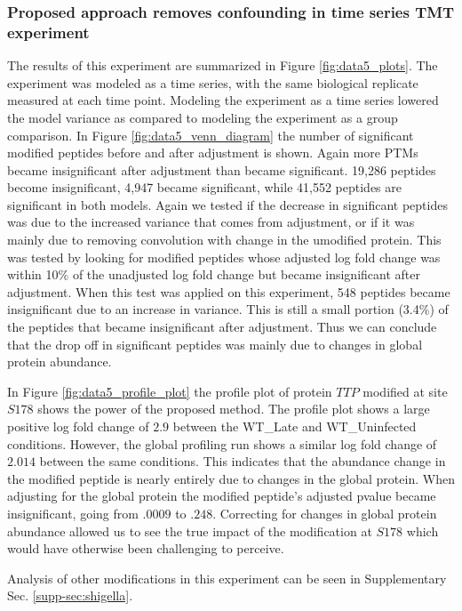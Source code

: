 \documentclass[mcp]{article}
\numberwithin{table}{section}
\begin{document}
\subsubsection*{Proposed approach removes confounding in time series TMT experiment}

The results of this experiment are summarized in Figure \ref{fig:data5_plots}. The experiment was modeled as a time series, with the same biological replicate measured at each time point. Modeling the experiment as a time series lowered the model variance as compared to modeling the experiment as a group comparison. In Figure \ref{fig:data5_venn_diagram} the number of significant modified peptides before and after adjustment is shown. Again more PTMs became insignificant after adjustment than became significant. 19,286 peptides become insignificant, 4,947 became significant, while 41,552 peptides are significant in both models. Again we tested if the decrease in significant peptides was due to the increased variance that comes from adjustment, or if it was mainly due to removing convolution with change in the umodified protein. This was tested by looking for modified peptides whose adjusted log fold change was within 10\% of the unadjusted log fold change but became insignificant after adjustment. When this test was applied on this experiment, 548 peptides became insignificant due to an increase in variance. This is still a small portion (3.4\%) of the peptides that became insignificant after adjustment. Thus we can conclude that the drop off in significant peptides was mainly due to changes in global protein abundance.

In Figure \ref{fig:data5_profile_plot} the profile plot of protein $TTP$ modified at site $S178$ shows the power of the proposed method.  The profile plot shows a large positive log fold change of $2.9$ between the WT\_Late and WT\_Uninfected conditions. However, the global profiling run shows a similar log fold change of $2.014$ between the same conditions. This indicates that the abundance change in the modified peptide is nearly entirely due to changes in the global protein. When adjusting for the global protein the modified peptide's adjusted pvalue became insignificant, going from $.0009$ to $.248$. Correcting for changes in global protein abundance allowed us to see the true impact of the modification at $S178$ which would have otherwise been challenging to perceive.

Analysis of other modifications in this experiment can be seen in Supplementary Sec. \ref{supp-sec:shigella}.
\end{document}
